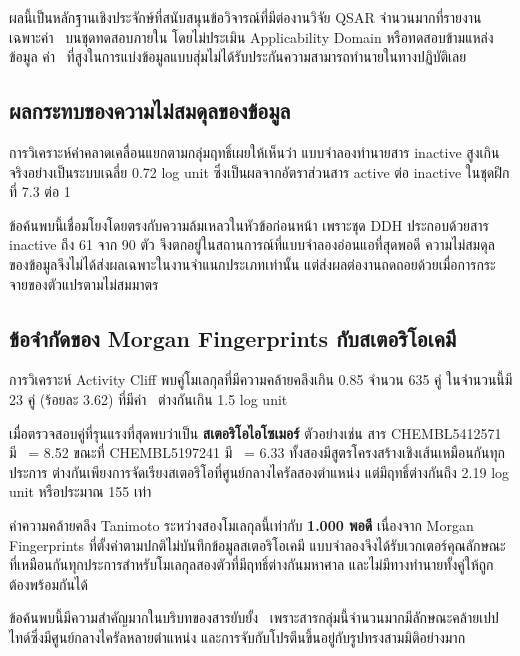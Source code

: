 \begin{keynote}
ผลนี้เป็นหลักฐานเชิงประจักษ์ที่สนับสนุนข้อวิจารณ์ที่มีต่องานวิจัย QSAR จำนวนมากที่รายงานเฉพาะค่า \Rsq\ บนชุดทดสอบภายใน โดยไม่ประเมิน Applicability Domain หรือทดสอบข้ามแหล่งข้อมูล ค่า \Rsq\ ที่สูงในการแบ่งข้อมูลแบบสุ่มไม่ได้รับประกันความสามารถทำนายในทางปฏิบัติเลย
\end{keynote}

\subsection{ผลกระทบของความไม่สมดุลของข้อมูล}

การวิเคราะห์ค่าคลาดเคลื่อนแยกตามกลุ่มฤทธิ์เผยให้เห็นว่า แบบจำลองทำนายสาร inactive สูงเกินจริงอย่างเป็นระบบเฉลี่ย 0.72 log unit ซึ่งเป็นผลจากอัตราส่วนสาร active ต่อ inactive ในชุดฝึกที่ 7.3 ต่อ 1

ข้อค้นพบนี้เชื่อมโยงโดยตรงกับความล้มเหลวในหัวข้อก่อนหน้า เพราะชุด DDH ประกอบด้วยสาร inactive ถึง 61 จาก 90 ตัว จึงตกอยู่ในสถานการณ์ที่แบบจำลองอ่อนแอที่สุดพอดี ความไม่สมดุลของข้อมูลจึงไม่ได้ส่งผลเฉพาะในงานจำแนกประเภทเท่านั้น แต่ส่งผลต่องานถดถอยด้วยเมื่อการกระจายของตัวแปรตามไม่สมมาตร

\subsection{ข้อจำกัดของ Morgan Fingerprints กับสเตอริโอเคมี}

การวิเคราะห์ Activity Cliff พบคู่โมเลกุลที่มีความคล้ายคลึงเกิน 0.85 จำนวน 635 คู่ ในจำนวนนี้มี 23 คู่ (ร้อยละ 3.62) ที่มีค่า \pICfifty\ ต่างกันเกิน 1.5 log unit

เมื่อตรวจสอบคู่ที่รุนแรงที่สุดพบว่าเป็น \textbf{สเตอริโอไอโซเมอร์} ตัวอย่างเช่น สาร CHEMBL5412571 มี \pICfifty\ = 8.52 ขณะที่ CHEMBL5197241 มี \pICfifty\ = 6.33 ทั้งสองมีสูตรโครงสร้างเชิงเส้นเหมือนกันทุกประการ ต่างกันเพียงการจัดเรียงสเตอริโอที่ศูนย์กลางไครัลสองตำแหน่ง แต่มีฤทธิ์ต่างกันถึง 2.19 log unit หรือประมาณ 155 เท่า

ค่าความคล้ายคลึง Tanimoto ระหว่างสองโมเลกุลนี้เท่ากับ \textbf{1.000 พอดี} เนื่องจาก Morgan Fingerprints ที่ตั้งค่าตามปกติไม่บันทึกข้อมูลสเตอริโอเคมี แบบจำลองจึงได้รับเวกเตอร์คุณลักษณะที่เหมือนกันทุกประการสำหรับโมเลกุลสองตัวที่มีฤทธิ์ต่างกันมหาศาล และไม่มีทางทำนายทั้งคู่ให้ถูกต้องพร้อมกันได้

ข้อค้นพบนี้มีความสำคัญมากในบริบทของสารยับยั้ง \Mpro\ เพราะสารกลุ่มนี้จำนวนมากมีลักษณะคล้ายเปปไทด์ซึ่งมีศูนย์กลางไครัลหลายตำแหน่ง และการจับกับโปรตีนขึ้นอยู่กับรูปทรงสามมิติอย่างมาก

